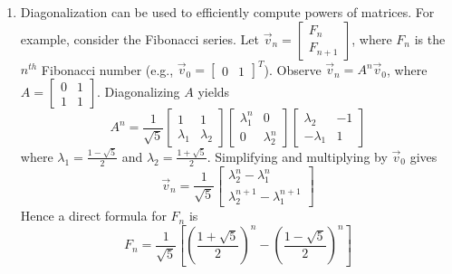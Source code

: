 \documentclass[10pt]{article}
\begin{document}
\begin{multicols*}{2}
\begin{enumerate}
\begin{enumerate}
        \item Diagonalization can be used to efficiently compute powers of matrices. For example, consider the Fibonacci series. Let $\vec{v}_n = \begin{bmatrix} F_n \\ F_{n+1} \end{bmatrix}$, where $F_n$ is the $n^{th}$ Fibonacci number (e.g., $\vec{v}_0 = \begin{bmatrix} 0 & 1 \end{bmatrix}^T$). Observe $\vec{v}_n = A^n\vec{v}_0$, where $A = \begin{bmatrix} 0 & 1 \\ 1 & 1 \end{bmatrix}$. Diagonalizing $A$ yields $$A^n = \frac{1}{\sqrt{5}} 
        \begin{bmatrix} 
        1 & 1 \\ 
        \lambda_1 & \lambda_2 
        \end{bmatrix}
        \begin{bmatrix}
        \lambda_1^n & 0 \\ 0 & \lambda_2^n
        \end{bmatrix}
        \begin{bmatrix}
        \lambda_2 & -1 \\ -\lambda_1 & 1 
        \end{bmatrix}$$
        where $\lambda_1 = \frac{1 - \sqrt{5}}{2}$ and $\lambda_2 = \frac{1 + \sqrt{5}}{2}$. Simplifying and multiplying by $\vec{v}_0$ gives $$\vec{v}_n = \frac{1}{\sqrt{5}} \begin{bmatrix} \lambda_2^n - \lambda_1^n \\[6 pt] \lambda_2^{n+1}-\lambda_1^{n+1} \end{bmatrix}$$
        Hence a direct formula for $F_n$ is 
        $$F_n = \frac{1}{\sqrt{5}} \left[ \left( \frac{1 + \sqrt{5}}{2} \right)^n  - \left( \frac{1 - \sqrt{5}}{2} \right)^n \right]$$
        

\end{enumerate}
\end{enumerate}
\end{multicols*}
\end{document}
